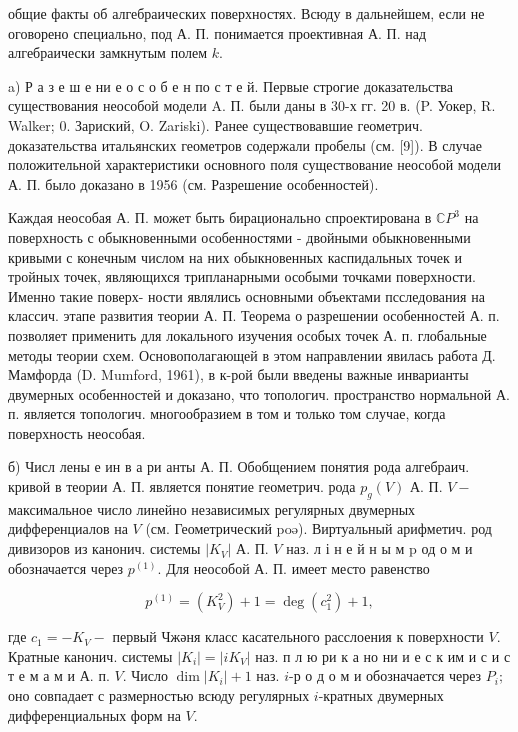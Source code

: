 \documentclass[10pt]{article}
\begin{document}
общие факты об алгебраических поверхностях. Всюду в дальнейшем, если не оговорено специально, под А. П. понимается проективная А. П. над алгебраически замкнутым полем $k$.



a) Р а з е ш е ни е о с о б е н по с т е й. Первые строгие доказательства существования неособой модели A. П. были даны в 30-х гг. 20 в. (P. Уокер, R. Walker; 0. Зариский, O. Zariski). Ранее существовавшие геометрич. доказательства итальянских геометров содержали пробелы (см. [9]). В случае положительной характеристики основного поля существование неособой модели А. П. было доказано в 1956 (см. Разрешение особенностей).



Каждая неособая А. П. может быть бирационально спроектирована в $\mathbb{C} P^{3}$ на поверхность с обыкновенными особенностями - двойными обыкновенными кривыми с конечным числом на них обыкновенных каспидальных точек и тройных точек, являющихся трипланарными особыми точками поверхности. Именно такие поверх- ности являлись основными объектами псследования на классич. этапе развития теории А. П. Теорема о разрешении особенностей А. п. позволяет применить для локального изучения особых точек А. п. глобальные методы теории схем. Основополагающей в этом направлении явилась работа Д. Мамфорда (D. Mumford, 1961), в к-рой были введены важные инварианты двумерных особенностей и доказано, что топологич. пространство нормальной А. п. является топологич. многообразием в том и только том случае, когда поверхность неособая.



б) Числ лены е ин в а ри анты А. П. Обобщением понятия рода алгебраич. кривой в теории А. П. является понятие геометрич. рода $p_{g}(V)$ А. П. $V-$ максимальное число линейно независимых регулярных двумерных дифференциалов на $V$ (см. Геометрический poə). Виртуальный арифметич. род дивизоров из канонич. системы $\left|K_{V}\right|$ А. П. $V$ наз. л і н е й н ы м p од о м и обозначается через $p^{(1)}$. Для неособой А. П. имеет место равенство



\[

p^{(1)}=\left(K_{V}^{2}\right)+1=\operatorname{deg}\left(c_{1}^{2}\right)+1,

\]



где $c_{1}=-K_{V}-$ первый Чжәня класс касательного расслоения к поверхности $V$. Кратные канонич. системы $\left|K_{i}\right|=\left|i K_{V}\right|$ наз. п л ю ри к а но ни и е с к им и с и с т е м а м и А. п. $V$. Число $\operatorname{dim}\left|K_{i}\right|+1$ наз. $i$-р о д о м и обозначается через $P_{i} ;$ оно совпадает с размерностью всюду регулярных $i$-кратных двумерных дифференциальных форм на $V$.
\end{document}

